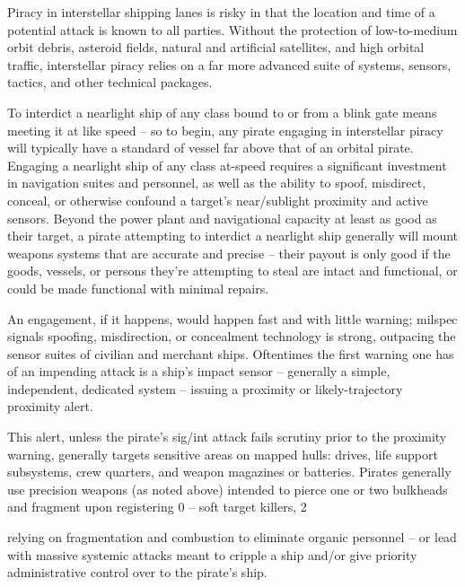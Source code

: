 Piracy in interstellar shipping lanes is risky in that the location and time of a potential attack is  
known to all parties. Without the protection of low-to-medium orbit debris, asteroid fields, natural  
and artificial satellites, and high orbital traffic, interstellar piracy relies on a far more advanced  
suite of systems, sensors, tactics, and other technical packages. 
 

To interdict a nearlight ship of any class bound to or from a blink gate means meeting it at like  
speed -- so to begin, any pirate engaging in interstellar piracy will typically have a standard of  
vessel far above that of an orbital pirate. Engaging a nearlight ship of any class at-speed requires  
a significant investment in navigation suites and personnel, as well as the ability to spoof,  
misdirect, conceal, or otherwise confound a target’s near/sublight proximity and active sensors.  
Beyond the power plant and navigational capacity at least as good as their target, a pirate  
attempting to interdict a nearlight ship generally will mount weapons systems that are accurate  
and precise -- their payout is only good if the goods, vessels, or persons they’re attempting to  
steal are intact and functional, or could be made functional with minimal repairs. 
 

                                                                                                         


An engagement, if it happens, would happen fast and with little warning; milspec signals  
spoofing, misdirection, or concealment technology is strong, outpacing the sensor suites of  
civilian and merchant ships. Oftentimes the first warning one has of an impending attack is a  
ship’s impact sensor -- generally a simple, independent, dedicated system -- issuing a proximity  
or likely-trajectory proximity alert. 
 

This alert, unless the pirate’s sig/int attack fails scrutiny prior to the proximity warning, generally  
targets sensitive areas on mapped hulls: drives, life support subsystems, crew quarters, and  
weapon magazines or batteries. Pirates generally use precision weapons (as noted above)  
intended to pierce one or two bulkheads and fragment upon registering 0  -- soft target killers,  
                                                                                            2  

relying on fragmentation and combustion to eliminate organic personnel -- or lead with massive  
systemic attacks meant to cripple a ship and/or give priority administrative control over to the  
pirate’s ship.   

